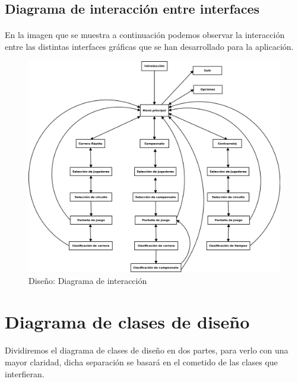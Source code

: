 \subsection{Diagrama de interacción entre interfaces}

\paragraph{}
En la imagen que se muestra a continuación podemos observar la interacción
entre las distintas interfaces gráficas que se han 
desarrollado para la aplicación.

\begin{figure}[H]
  \label{diagrama_interaccion}
  \begin{center}
    \includegraphics[scale=0.4]{imagenes/diseno/diagrama_interaccion.png}
  \end{center}
  \caption{Diseño: Diagrama de interacción}
\end{figure}

\section{Diagrama de clases de diseño}

\paragraph{}
Dividiremos el diagrama de clases de diseño en dos partes, para verlo con una mayor claridad, dicha separación se basará en el 
cometido de las clases que interfieran.


